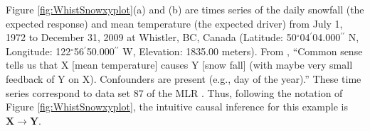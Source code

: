 Figure \ref{fig:WhistSnowxyplot}(a) and (b)  are times series of the daily snowfall (the expected response) and mean temperature (the expected driver) from July 1, 1972 to December 31, 2009 at Whistler, BC, Canada (Latitude: 50$^\circ$04$^\prime$04.000$^{\prime\prime}$ N, Longitude: 122$^\circ$56$^\prime$50.000$^{\prime\prime}$ W, Elevation: 1835.00 meters).  From \cite{bache2013}, ``Common sense tells us that X [mean temperature] causes Y [snow fall] (with maybe very small feedback of Y on X). Confounders are present (e.g., day of the year).''  These time series correspond to data set 87 of the MLR \cite{bache2013}.  Thus, following the notation of Figure \ref{fig:WhistSnowxyplot}, the intuitive causal inference for this example is $\mathbf{X}\rightarrow\mathbf{Y}$. 
